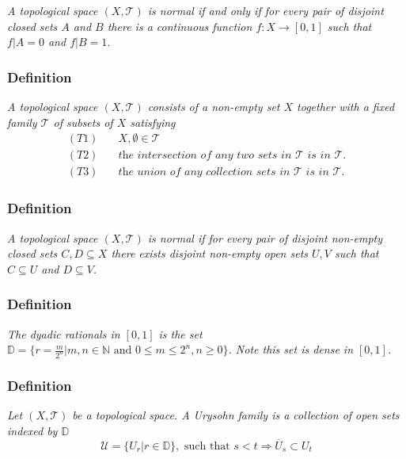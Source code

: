 \documentclass[12pt]{article}
\newcommand{\D}{\mathbb{D}} %
\begin{document}

\textit{A topological space $(X, \mathcal{T})$ is normal if and only if for every pair of disjoint closed sets $A$ and $B$ there is a continuous function $f : X \rightarrow [0, 1]$ such that $f | A = 0$ and $f | B = 1$.}




\flushleft\subsubsection*{Definition}
\textit{A topological space $(X, \mathcal{T})$ consists of a non-empty set $X$ together with a fixed family $\mathcal{T}$ of subsets of $X$ satisfying}
		\begin{align*}
			(T1)& \quad X, \emptyset \in \mathcal{T}\\
			(T2)& \quad \textit{the intersection of any two sets in $\mathcal{T}$ is in $\mathcal{T}$.}\\
			(T3)& \quad \textit{the union of any collection sets in $\mathcal{T}$ is in $\mathcal{T}$.}
		\end{align*}




\subsubsection*{Definition}
\textit{A topological space $(X, \mathcal{T})$ is normal if for every pair of disjoint non-empty closed sets $C, D \subseteq X$ there exists disjoint non-empty open sets $U, V$ such that $C \subseteq U$ and $D \subseteq V$.}\\




\subsubsection*{Definition}
\textit{The dyadic rationals in $[0, 1]$ is the set $\mathbb{D} = \big\{r = \frac{m}{2^n} \vert m,n \in \mathbb{N} \text{ and } 0 \leq m \leq 2^n, n \geq 0 \big\}$. Note this set is dense in $[0, 1]$.}




\subsubsection*{Definition}
\textit{Let $(X, \mathcal{T})$ be a topological space. A Urysohn family is a collection of open sets indexed by $\D$}
$$\mathcal{U} = \{U_r \vert r \in \D\}, \text{ such that } s < t \Rightarrow \overline{U}_s \subset U_t$$
\end{document}
